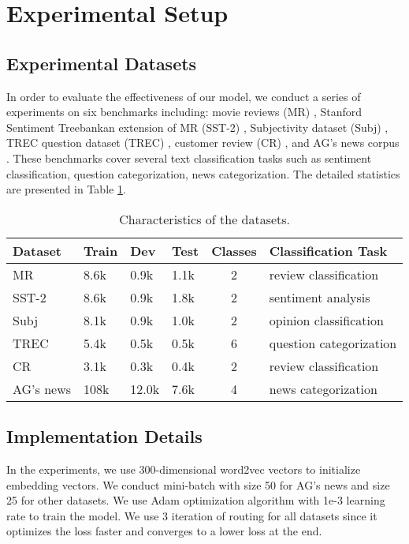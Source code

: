\documentclass[11pt]{article}
\begin{document}
\section{Experimental Setup}
\subsection{Experimental Datasets}


In order to evaluate the effectiveness of our model, 
we conduct a series of experiments on six benchmarks including: movie reviews (MR) \cite{pang2005seeing}, Stanford Sentiment Treebankan extension of MR (SST-2) \cite{socher2013recursive}, Subjectivity dataset (Subj) \cite{pang2004sentimental},  TREC question dataset (TREC) \cite{li2002learning}, customer review (CR) \cite{hu2004mining}, and AG's news corpus \cite{conneau2017very}. 
These benchmarks cover several text classification tasks such as sentiment classification, question categorization, news categorization. The detailed statistics are presented in Table \ref{tab:0}. 
\begin{table}[h]
\centering
	\resizebox{1\columnwidth}{!}
	{\footnotesize
	\begin{tabular}{|l|lllc|l|}
		\toprule
		Dataset & Train & Dev &Test & Classes & Classification Task \\
		\midrule
		MR &  8.6k & 0.9k & 1.1k & 2 & review classification\\
		SST-2 & 8.6k  & 0.9k & 1.8k & 2 & sentiment analysis\\
		Subj & 8.1k  & 0.9k & 1.0k & 2 & opinion classification\\
		TREC & 5.4k & 0.5k & 0.5k & 6 & question categorization\\
		CR & 3.1k & 0.3k & 0.4k & 2 & review classification\\
		AG's news & 108k & 12.0k & 7.6k & 4 & news categorization\\
		\bottomrule
	\end{tabular}
	}
\caption{Characteristics of the datasets.}
\label{tab:0}
\vspace{-0.3cm}
\end{table}













\subsection{Implementation Details}
In the experiments, we use 300-dimensional word2vec \cite{mikolov2013distributed} vectors to initialize embedding vectors.
We conduct mini-batch with size 50 for AG's news and size 25 for other datasets. We use Adam optimization algorithm with 1e-3 learning rate to train the model. We use 3 iteration of routing for all datasets since it optimizes the loss faster and converges to a lower loss at the end.
\end{document}
